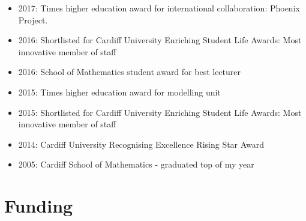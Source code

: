 \documentclass[10pt]{article}
\begin{document}
\begin{itemize}
  \item 2017: Times higher education award for international collaboration: Phoenix Project.

  \item 2016: Shortlisted for Cardiff University Enriching Student Life Awards: Most innovative member of staff

  \item 2016: School of Mathematics student award for best lecturer

  \item 2015: Times higher education award for modelling unit

  \item 2015: Shortlisted for Cardiff University Enriching Student Life Awards: Most innovative member of staff

  \item 2014: Cardiff University Recognising Excellence Rising Star Award

  \item 2005: Cardiff School of Mathematics - graduated top of my year

\end{itemize}

\section{Funding}
\end{document}
